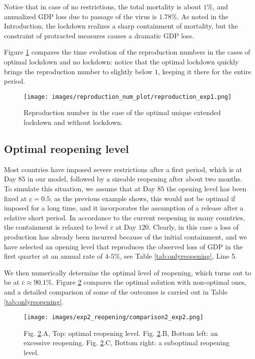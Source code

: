 \documentclass{amsart}
\begin{document}
Notice that in case of no restrictions, the total mortality
is about $1\%$, and  annualized GDP loss 
due to passage of the virus is $1.78\%$.
As noted in the Introduction, the lockdown realizes a sharp containment of
mortality, but the constraint of protracted measures
causes a dramatic GDP loss.

Figure \ref{reproduction_exp1} compares the time evolution of the reproduction numbers in the cases of optimal lockdown and no lockdown: notice that the optimal lockdown quickly brings
the reproduction number to slightly below $1$, keeping it there for the
entire period.

\begin{figure}[h!]
    \centering
    \texttt{[image: images/reproduction\_num\_plot/reproduction\_exp1.png]}
    \caption{Reproduction number in the case of the optimal unique extended lockdown and without lockdown.}
    \label{reproduction_exp1}
\end{figure}

\vskip 2cm

\subsection{Optimal reopening level}
\label{sec:opt_reopening}
Most countries have imposed severe restrictions
after a first period, which is at Day $85$ in
our model, followed by a sizeable reopening after 
about two months. To simulate this situation,
we assume that at Day $85$
the  opening level has been fixed at $\underline c=0.5$; as the previous example shows,
this would not be optimal if imposed for a long
time, and it incorporates the assumption
of a release after a relative short period. In  accordance to the current reopening in many countries,
 the containment is
relaxed  to level $\overline c$
at Day $120$. 
Clearly, in this case a loss of production has already been
incurred because of the initial containment, and 
we have selected an opening level that  reproduces 
the observed loss of GDP in the first quarter at
an annual rate of $4$-$5\%$, see Table \ref{tab:onlyreopening}, Line 5.

We then numerically determine the optimal level of reopening,
which turns out to be
at   $\overline c \approx 90.1\%$.
Figure  \ref{comparison2_exp2} compares the optimal solution
with non-optimal ones, and a detailed comparison
of some of the outcomes is carried out in Table \ref{tab:onlyreopening}.

\begin{figure}[h!]
    \centering
    \texttt{[image: images/exp2\_reopening/comparison2\_exp2.png]}
    \caption{Fig. \ref{comparison2_exp2}.A, Top: optimal reopening level. Fig. \ref{comparison2_exp2}.B, Bottom left: an excessive reopening. Fig. \ref{comparison2_exp2}.C, Bottom right: a suboptimal reopening level.}
    \label{comparison2_exp2}
\end{figure}
\end{document}
